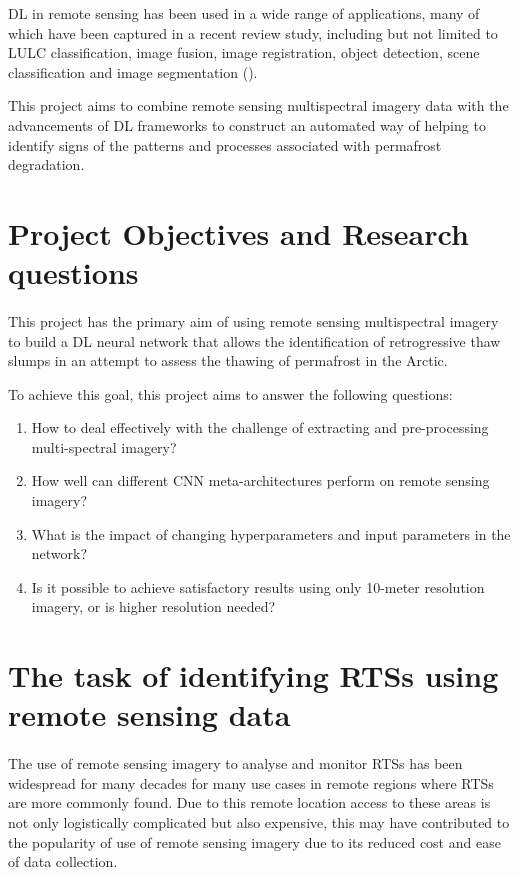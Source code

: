\gls{DL} in remote sensing has been used in a wide range of applications, many of which have been captured in a recent review study, including but not limited to \gls{LULC} classification, image fusion, image registration, object detection, scene classification and image segmentation (\cite{MA2019166}).

This project aims to combine remote sensing multispectral imagery data with the advancements of \gls{DL} frameworks to construct an automated way of helping to identify signs of the patterns and processes associated with permafrost degradation.

\section{Project Objectives and Research questions} \label{projectqs}
\paragraph{}
This project has the primary aim of using remote sensing multispectral imagery to build a \gls{DL} neural network that allows the identification of retrogressive thaw slumps in an attempt to assess the thawing of permafrost in the Arctic.

To achieve this goal, this project aims to answer the following questions:

\begin{enumerate}
    \item How to deal effectively with the challenge of extracting and pre-processing multi-spectral imagery?
    \item How well can different \gls{CNN} meta-architectures perform on remote sensing imagery?
    \item What is the impact of changing hyperparameters and input parameters in the network?
    \item Is it possible to achieve satisfactory results using only 10-meter resolution imagery, or is higher resolution needed?
\end{enumerate}

\section{The task of identifying \gls{RTS}s using remote sensing data} \label{rts_task}
\paragraph{}
The use of remote sensing imagery to analyse and monitor \gls{RTS}s has been widespread for many decades for many use cases in remote regions where \gls{RTS}s are more commonly found. Due to this remote location access to these areas is not only logistically complicated but also expensive, this may have contributed to the popularity of use of remote sensing imagery due to its reduced cost and ease of data collection.

